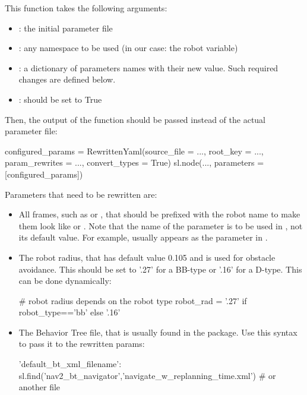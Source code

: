 \documentclass{ecnreport}
\begin{document}
This function takes the following arguments:
\begin{itemize}
\item {}: the initial parameter file
\item {}: any namespace to be used (in our case: the robot variable)
\item {}: a dictionary of parameters names with their new value. Such required changes are defined below.
\item {}: should be set to True
\end{itemize}

Then, the output of the function should be passed instead of the actual parameter file:
\begin{pythoncodelarge}
configured_params = RewrittenYaml(source_file = ...,
                                    root_key = ..., 
                                    param_rewrites = ...,
                                    convert_types = True)
sl.node(..., parameters = [configured_params])
\end{pythoncodelarge}

Parameters that need to be rewritten are:
\begin{itemize}
 \item All frames, such as  or , that should be prefixed with the robot name to make them look like  or . Note that the name of the parameter is to be used in , not its default value. For example,  usually appears as the  parameter in .
 \item The robot radius, that has default value 0.105 and is used for obstacle avoidance. This should be set to '.27' for a BB-type or '.16' for a D-type. This can be done dynamically:
\begin{pythoncodelarge}
# robot radius depends on the robot type
robot_rad = '.27' if robot_type=='bb' else '.16'
\end{pythoncodelarge}
\item The Behavior Tree file, that is usually found in the  package. Use this syntax to pass it to the rewritten params:
\begin{pythoncode}
 'default_bt_xml_filename': sl.find('nav2_bt_navigator','navigate_w_replanning_time.xml')   # or another file
\end{pythoncode}
\end{itemize}
\end{document}
